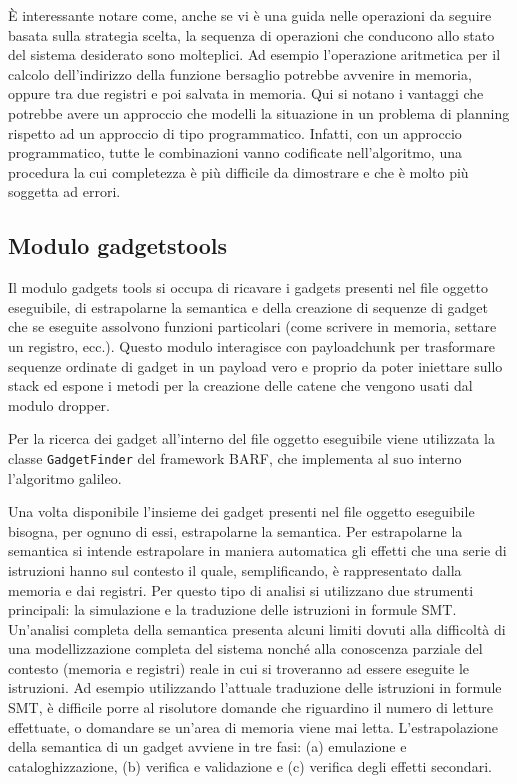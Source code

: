 È interessante notare come, anche se vi è una guida nelle operazioni
da seguire basata sulla strategia scelta, la sequenza di operazioni
che conducono allo stato del sistema desiderato sono molteplici. Ad
esempio l'operazione aritmetica per il calcolo dell'indirizzo della
funzione bersaglio potrebbe avvenire in memoria, oppure tra due
registri e poi salvata in memoria. Qui si notano i vantaggi che
potrebbe avere un approccio che modelli la situazione in un problema
di planning rispetto ad un approccio di tipo programmatico. Infatti,
con un approccio programmatico, tutte le combinazioni vanno codificate
nell'algoritmo, una procedura la cui completezza è più difficile da
dimostrare e che è molto più soggetta ad errori.

\subsection{Modulo gadgetstools}

Il modulo gadgets tools si occupa di ricavare i gadgets presenti nel
file oggetto eseguibile, di estrapolarne la semantica e della
creazione di sequenze di gadget che se eseguite assolvono funzioni
particolari (come scrivere in memoria, settare un registro,
ecc.). Questo modulo interagisce con payloadchunk per trasformare
sequenze ordinate di gadget in un payload vero e proprio da poter
iniettare sullo stack ed espone i metodi per la creazione delle catene
che vengono usati dal modulo dropper.

Per la ricerca dei gadget all'interno del file oggetto eseguibile
viene utilizzata la classe \lstinline{GadgetFinder} del framework
BARF, che implementa al suo interno l'algoritmo galileo\cite{roemer-12}. 


Una volta disponibile l'insieme dei gadget presenti nel file oggetto
eseguibile bisogna, per ognuno di essi, estrapolarne la semantica. Per
estrapolarne la semantica si intende estrapolare in maniera automatica
gli effetti che una serie di istruzioni hanno sul contesto il quale,
semplificando, è rappresentato dalla memoria e dai registri. Per
questo tipo di analisi si utilizzano due strumenti principali: la
simulazione e la traduzione delle istruzioni in formule
SMT. Un'analisi completa della semantica presenta alcuni limiti dovuti
alla difficoltà di una modellizzazione completa del sistema nonché
alla conoscenza parziale del contesto (memoria e registri) reale in
cui si troveranno ad essere eseguite le istruzioni. Ad esempio
utilizzando l'attuale traduzione delle istruzioni in formule SMT, è
difficile porre al risolutore domande che riguardino il numero di
letture effettuate, o domandare se un'area di memoria viene mai
letta. L'estrapolazione della semantica di un gadget avviene in tre
fasi: (a) emulazione e cataloghizzazione, (b) verifica e validazione e
(c) verifica degli effetti secondari.

